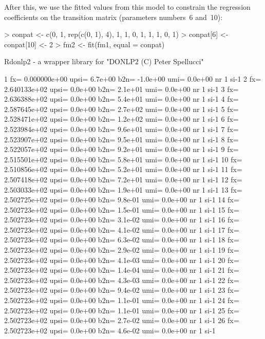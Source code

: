 \documentclass[article]{jss}
\begin{document}
After this, we use the fitted values from this model to constrain the
regression coefficients on the transition matrix (parameters numbers~6
and~10):
\begin{Schunk}
\begin{Sinput}
> conpat <- c(0, 1, rep(c(0, 1), 4), 1, 1, 0, 1, 1, 1, 0, 1)
> conpat[6] <- conpat[10] <- 2
> fm2 <- fit(fm1, equal = conpat)
\end{Sinput}
\begin{Soutput}
Rdonlp2 - a wrapper library for "DONLP2 (C) Peter Spellucci"

    1 fx=   0.000000e+00 upsi=  6.7e+00 b2n= -1.0e+00 umi=  0.0e+00 nr   1 si-1
    2 fx=   2.640133e+02 upsi=  0.0e+00 b2n=  2.1e+01 umi=  0.0e+00 nr   1 si-1
    3 fx=   2.636388e+02 upsi=  0.0e+00 b2n=  5.4e+01 umi=  0.0e+00 nr   1 si-1
    4 fx=   2.587645e+02 upsi=  0.0e+00 b2n=  2.7e+02 umi=  0.0e+00 nr   1 si-1
    5 fx=   2.528471e+02 upsi=  0.0e+00 b2n=  1.2e+02 umi=  0.0e+00 nr   1 si-1
    6 fx=   2.523984e+02 upsi=  0.0e+00 b2n=  9.6e+01 umi=  0.0e+00 nr   1 si-1
    7 fx=   2.523907e+02 upsi=  0.0e+00 b2n=  9.5e+01 umi=  0.0e+00 nr   1 si-1
    8 fx=   2.522057e+02 upsi=  0.0e+00 b2n=  9.2e+01 umi=  0.0e+00 nr   1 si-1
    9 fx=   2.515501e+02 upsi=  0.0e+00 b2n=  5.8e+01 umi=  0.0e+00 nr   1 si-1
   10 fx=   2.510856e+02 upsi=  0.0e+00 b2n=  5.2e+01 umi=  0.0e+00 nr   1 si-1
   11 fx=   2.507418e+02 upsi=  0.0e+00 b2n=  7.2e+01 umi=  0.0e+00 nr   1 si-1
   12 fx=   2.503033e+02 upsi=  0.0e+00 b2n=  1.9e+01 umi=  0.0e+00 nr   1 si-1
   13 fx=   2.502725e+02 upsi=  0.0e+00 b2n=  9.8e-01 umi=  0.0e+00 nr   1 si-1
   14 fx=   2.502723e+02 upsi=  0.0e+00 b2n=  1.5e-01 umi=  0.0e+00 nr   1 si-1
   15 fx=   2.502723e+02 upsi=  0.0e+00 b2n=  3.1e-02 umi=  0.0e+00 nr   1 si-1
   16 fx=   2.502723e+02 upsi=  0.0e+00 b2n=  4.1e-02 umi=  0.0e+00 nr   1 si-1
   17 fx=   2.502723e+02 upsi=  0.0e+00 b2n=  6.3e-02 umi=  0.0e+00 nr   1 si-1
   18 fx=   2.502723e+02 upsi=  0.0e+00 b2n=  2.9e-02 umi=  0.0e+00 nr   1 si-1
   19 fx=   2.502723e+02 upsi=  0.0e+00 b2n=  4.1e-03 umi=  0.0e+00 nr   1 si-1
   20 fx=   2.502723e+02 upsi=  0.0e+00 b2n=  1.4e-04 umi=  0.0e+00 nr   1 si-1
   21 fx=   2.502723e+02 upsi=  0.0e+00 b2n=  4.3e-03 umi=  0.0e+00 nr   1 si-1
   22 fx=   2.502723e+02 upsi=  0.0e+00 b2n=  9.4e-02 umi=  0.0e+00 nr   1 si-1
   23 fx=   2.502723e+02 upsi=  0.0e+00 b2n=  1.1e-01 umi=  0.0e+00 nr   1 si-1
   24 fx=   2.502723e+02 upsi=  0.0e+00 b2n=  1.1e-01 umi=  0.0e+00 nr   1 si-1
   25 fx=   2.502723e+02 upsi=  0.0e+00 b2n=  2.7e-02 umi=  0.0e+00 nr   1 si-1
   26 fx=   2.502723e+02 upsi=  0.0e+00 b2n=  4.6e-02 umi=  0.0e+00 nr   1 si-1

\end{Soutput}
\end{Schunk}
\end{document}
